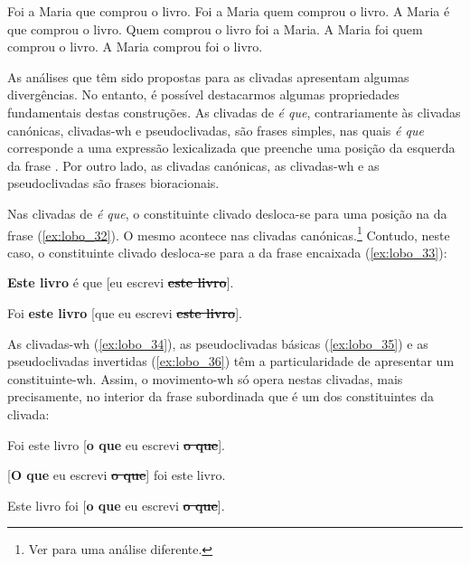 \documentclass[output=paper]{LSP/langsci}
\begin{document}
\ea\label{ex:lobo_26} Foi a Maria que comprou o livro.\z
\ea\label{ex:lobo_27} Foi a Maria quem comprou o livro.\z
\ea\label{ex:lobo_28} A Maria é que comprou o livro.\z
\ea\label{ex:lobo_29} Quem comprou o livro foi a Maria.\z
\ea\label{ex:lobo_30} A Maria foi quem comprou o livro.\z
\ea\label{ex:lobo_31} A Maria comprou foi o livro.\z

As análises que têm sido propostas para as clivadas apresentam algumas divergências. No entanto, é possível destacarmos algumas propriedades fundamentais destas construções. As clivadas de \textit{é que}, contrariamente às clivadas canónicas, clivadas-wh e pseudoclivadas, são frases simples, nas quais \textit{é que} corresponde a uma expressão lexicalizada que preenche uma posição da  esquerda da frase \citep{soares2006,lobo2006}. Por outro lado, as clivadas canónicas, as clivadas-wh e as pseudoclivadas são frases bioracionais.

Nas clivadas de \textit{é que}, o constituinte clivado desloca-se para uma posição na  da frase (\ref{ex:lobo_32}). O mesmo acontece nas clivadas canónicas.\footnote{Ver \citet{vercauteren2015} para uma análise diferente.} Contudo, neste caso, o constituinte clivado desloca-se para a  da frase encaixada (\ref{ex:lobo_33}):

\ea\label{ex:lobo_32} \textbf{Este livro} é que [eu escrevi \sout{\textbf{este livro}}].\z

\ea\label{ex:lobo_33} Foi \textbf{este livro} [que eu escrevi \sout{\textbf{este livro}}].\z

As clivadas-wh (\ref{ex:lobo_34}), as pseudoclivadas básicas (\ref{ex:lobo_35}) e as pseudoclivadas invertidas (\ref{ex:lobo_36}) têm a particularidade de apresentar um constituinte-wh. Assim, o movimento-wh só opera nestas clivadas, mais precisamente, no interior da frase subordinada que é um dos constituintes da clivada:

\ea\label{ex:lobo_34} Foi este livro [\textbf{o que} eu escrevi \sout{\textbf{o que}}].\z

\ea\label{ex:lobo_35} [\textbf{O que} eu escrevi \sout{\textbf{o que}}] foi este livro.\z

\ea\label{ex:lobo_36} Este livro foi [\textbf{o que} eu escrevi \sout{\textbf{o que}}].\z
\end{document}
